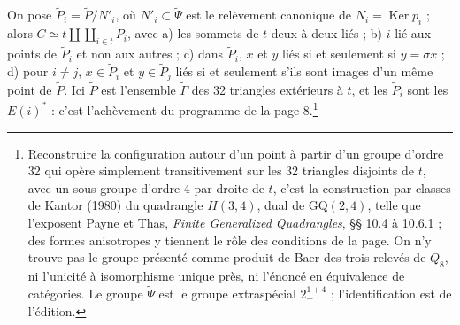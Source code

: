 \documentclass[11pt,a4paper]{article}
\begin{document}
On pose $\widetilde P_i = \widetilde P/N'_i$, où $N'_i \subset \widetilde\Psi$
est le relèvement canonique de $N_i = \operatorname{Ker} p_i$ ; alors $C \simeq
t \amalg \coprod_{i \in t} \widetilde P_i$, avec a) les sommets de $t$ deux à
deux liés ; b) $i$ lié aux points de $\widetilde P_i$ et non aux autres ; c)
dans $\widetilde P_i$, $x$ et $y$ liés si et seulement si $y = \sigma x$ ; d)
pour $i \neq j$, $x \in \widetilde P_i$ et $y \in \widetilde P_j$ liés si et
seulement s'ils sont images d'un même point de $\widetilde P$. Ici $\widetilde
P$ est l'ensemble $\widetilde\Gamma$ des 32 triangles extérieurs à $t$, et les
$\widetilde P_i$ sont les $E(i)^*$ : c'est l'achèvement du programme de la
page 8.\footnote{Reconstruire la configuration autour d'un point à partir d'un
groupe d'ordre 32 qui opère simplement transitivement sur les 32 triangles
disjoints de $t$, avec un sous-groupe d'ordre 4 par droite de $t$, c'est la
construction par classes de Kantor (1980) du quadrangle $H(3, 4)$, dual de
$\mathrm{GQ}(2, 4)$, telle que l'exposent Payne et Thas, \emph{Finite
Generalized Quadrangles}, §§ 10.4 à 10.6.1 ; des formes anisotropes y tiennent
le rôle des conditions de la page. On n'y trouve pas le groupe présenté comme
produit de Baer des trois relevés de $Q_8$, ni l'unicité à isomorphisme unique
près, ni l'énoncé en équivalence de catégories. Le groupe $\widetilde\Psi$ est
le groupe extraspécial $2^{1+4}_+$ ; l'identification est de l'édition.}
\end{document}
